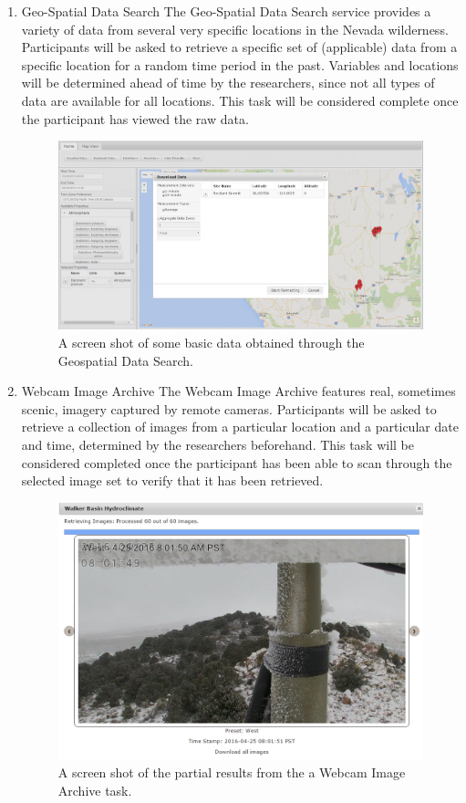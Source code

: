 \documentclass{article}
\begin{document}
\begin{enumerate}
\item Geo-Spatial Data Search
The Geo-Spatial Data Search service provides a variety of data from several very specific locations in the Nevada wilderness. Participants will be asked to retrieve a specific set of (applicable) data from a specific location for a random time period in the past. Variables and locations will be determined ahead of time by the researchers, since not all types of data are available for all locations. This task will be considered complete once the participant has viewed the raw data.
    
\begin{figure}[h!]
  \centering
  \includegraphics[width=.6\linewidth]{geospatial}
  \caption{A screen shot of some basic data obtained through the Geospatial Data Search.}
  \label{fig:geospatial}
\end{figure}

\item Webcam Image Archive
The Webcam Image Archive features real, sometimes scenic, imagery captured by remote cameras. Participants will be asked to retrieve a collection of images from a particular location and a particular date and time, determined by the researchers beforehand. This task will be considered completed once the participant has been able to scan through the selected image set to verify that it has been retrieved.

\begin{figure}[h!]
  \centering
  \includegraphics[width=.6\linewidth]{webcam-image-archive-example}
  \caption{A screen shot of the partial results from the a Webcam Image Archive task.}
  \label{fig:webcam-image-archive}
\end{figure}


\end{enumerate}
\end{document}
